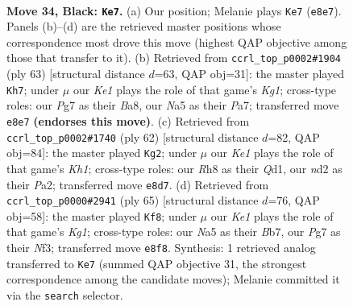 \documentclass[11pt]{article}
\begin{document}
\clearpage

\begin{figure}[p]\centering
\begin{subfigure}{0.46\textwidth}\centering
\resizebox{\linewidth}{!}{%
\newchessgame
\chessboard[
  setfen={r3k2r/p5pp/3b4/n2p3Q/p2P2PP/4P2K/1q1N4/2R5 b - - 1 34},
  showmover=false,
  pgfstyle=straightmove, color=movearrow, markmove={e8-e7}
]}
\caption{}
\end{subfigure}\hfill
\begin{subfigure}{0.46\textwidth}\centering
\resizebox{\linewidth}{!}{%
\newchessgame
\chessboard[
  setfen={b3r1k1/p4p2/6p1/8/3NpP1q/4P2P/P5QK/1R6 b - - 0 32},
  showmover=false,
  pgfstyle=straightmove, color=movearrow, markmove={g8-h7}
]}
\caption{}
\end{subfigure}
\\[4pt]
\begin{subfigure}{0.46\textwidth}\centering
\resizebox{\linewidth}{!}{%
\newchessgame
\chessboard[
  setfen={1R6/p3pkbp/3p2p1/2P4q/2Pn4/5P2/P4P2/3QR2K w - - 13 32},
  showmover=false,
  pgfstyle=straightmove, color=movearrow, markmove={h1-g2}
]}
\caption{}
\end{subfigure}\hfill
\begin{subfigure}{0.46\textwidth}\centering
\resizebox{\linewidth}{!}{%
\newchessgame
\chessboard[
  setfen={4r1k1/1b6/p3p1Q1/1pq5/8/P1N2nP1/1PP1R3/2K5 b - - 2 33},
  showmover=false,
  pgfstyle=straightmove, color=movearrow, markmove={g8-f8}
]}
\caption{}
\end{subfigure}
\caption{\textbf{Move 34, Black: \texttt{Ke7}.} (a) Our position; Melanie plays \texttt{Ke7} (\texttt{e8e7}). Panels (b)--(d) are the retrieved master positions whose correspondence most drove this move (highest QAP objective among those that transfer to it). (b) Retrieved from \texttt{ccrl\_top\_p0002\#1904} (ply 63) [structural distance $d$=63, QAP obj=31]: the master played \texttt{Kh7}; under $\mu$ our \emph{Ke1} plays the role of that game's \emph{Kg1}; cross-type roles: our \emph{P}g7 as their \emph{B}a8, our \emph{N}a5 as their \emph{P}a7; transferred move \texttt{e8e7} \textbf{(endorses this move)}. (c) Retrieved from \texttt{ccrl\_top\_p0002\#1740} (ply 62) [structural distance $d$=82, QAP obj=84]: the master played \texttt{Kg2}; under $\mu$ our \emph{Ke1} plays the role of that game's \emph{Kh1}; cross-type roles: our \emph{R}h8 as their \emph{Q}d1, our \emph{n}d2 as their \emph{P}a2; transferred move \texttt{e8d7}. (d) Retrieved from \texttt{ccrl\_top\_p0000\#2941} (ply 65) [structural distance $d$=76, QAP obj=58]: the master played \texttt{Kf8}; under $\mu$ our \emph{Ke1} plays the role of that game's \emph{Kg1}; cross-type roles: our \emph{N}a5 as their \emph{B}b7, our \emph{P}g7 as their \emph{N}f3; transferred move \texttt{e8f8}. Synthesis: 1 retrieved analog transferred to \texttt{Ke7} (summed QAP objective 31, the strongest correspondence among the candidate moves); Melanie committed it via the \texttt{search} selector.}
\label{fig:thought-m67}
\end{figure}
\end{document}
